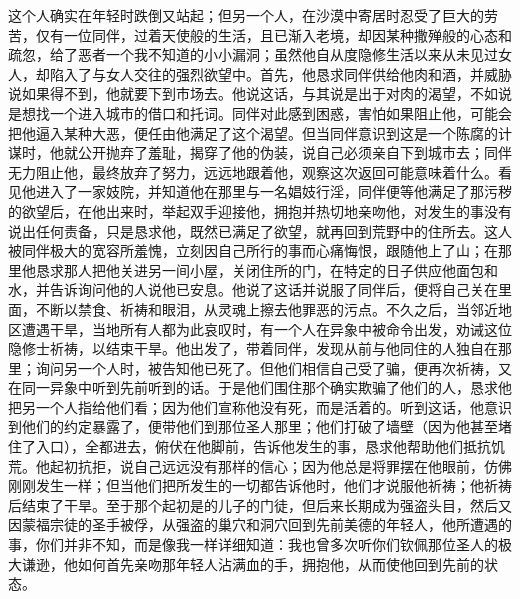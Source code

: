 这个人确实在年轻时跌倒又站起；但另一个人，在沙漠中寄居时忍受了巨大的劳苦，仅有一位同伴，过着天使般的生活，且已渐入老境，却因某种撒殚般的心态和疏忽，给了恶者一个我不知道的小小漏洞；虽然他自从度隐修生活以来从未见过女人，却陷入了与女人交往的强烈欲望中。首先，他恳求同伴供给他肉和酒，并威胁说如果得不到，他就要下到市场去。他说这话，与其说是出于对肉的渴望，不如说是想找一个进入城市的借口和托词。同伴对此感到困惑，害怕如果阻止他，可能会把他逼入某种大恶，便任由他满足了这个渴望。但当同伴意识到这是一个陈腐的计谋时，他就公开抛弃了羞耻，揭穿了他的伪装，说自己必须亲自下到城市去；同伴无力阻止他，最终放弃了努力，远远地跟着他，观察这次返回可能意味着什么。看见他进入了一家妓院，并知道他在那里与一名娼妓行淫，同伴便等他满足了那污秽的欲望后，在他出来时，举起双手迎接他，拥抱并热切地亲吻他，对发生的事没有说出任何责备，只是恳求他，既然已满足了欲望，就再回到荒野中的住所去。这人被同伴极大的宽容所羞愧，立刻因自己所行的事而心痛悔恨，跟随他上了山；在那里他恳求那人把他关进另一间小屋，关闭住所的门，在特定的日子供应他面包和水，并告诉询问他的人说他已安息。他说了这话并说服了同伴后，便将自己关在里面，不断以禁食、祈祷和眼泪，从灵魂上擦去他罪恶的污点。不久之后，当邻近地区遭遇干旱，当地所有人都为此哀叹时，有一个人在异象中被命令出发，劝诫这位隐修士祈祷，以结束干旱。他出发了，带着同伴，发现从前与他同住的人独自在那里；询问另一个人时，被告知他已死了。但他们相信自己受了骗，便再次祈祷，又在同一异象中听到先前听到的话。于是他们围住那个确实欺骗了他们的人，恳求他把另一个人指给他们看；因为他们宣称他没有死，而是活着的。听到这话，他意识到他们的约定暴露了，便带他们到那位圣人那里；他们打破了墙壁（因为他甚至堵住了入口），全都进去，俯伏在他脚前，告诉他发生的事，恳求他帮助他们抵抗饥荒。他起初抗拒，说自己远远没有那样的信心；因为他总是将罪摆在他眼前，仿佛刚刚发生一样；但当他们把所发生的一切都告诉他时，他们才说服他祈祷；他祈祷后结束了干旱。至于那个起初是的儿子的门徒，但后来长期成为强盗头目，然后又因蒙福宗徒的圣手被俘，从强盗的巢穴和洞穴回到先前美德的年轻人，他所遭遇的事，你们并非不知，而是像我一样详细知道：我也曾多次听你们钦佩那位圣人的极大谦逊，他如何首先亲吻那年轻人沾满血的手，拥抱他，从而使他回到先前的状态。\par

